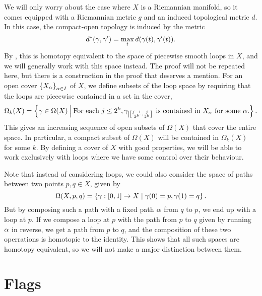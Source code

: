 We will only worry about the case where $X$ is a Riemannian manifold,
so it comes equipped with a Riemannian metric $g$ and an induced
topological metric $d$. In this case, the compact-open topology is
induced by the metric
\[ d^*(\gamma,\gamma') = \max_t d(\gamma(t),\gamma'(t)). \]
By \cite[Theorem 17.1]{milnor}, this is homotopy equivalent to the
space of piecewise smooth loops in $X$, and we will generally work
with this space instead. The proof will not be repeated here, but
there is a construction in the proof that deserves a mention. For an
open cover $\left\{ X_\alpha \right\}_{\alpha\in I}$ of $X$, we define subsets of the
loop space by requiring that the loops are piecewise contained in a
set in the cover,
\[ \Omega_k(X) = \left\{ \gamma \in \Omega(X) \: \Big\vert\:
  \text{For each } j \leq 2^k, \gamma_{\left|\left[
        \frac{j-1}{2^k},\frac{j}{2^k} \right]\right.} \text{ is 
    contained in $X_\alpha$ for some $\alpha$.}  \right\}. \]
This gives an increasing sequence of open subsets of $\Omega(X)$
that cover the entire space. In particular, a compact subset of
$\Omega(X)$ will be contained in $\Omega_k(X)$ for some $k$. By
defining a cover of $X$ with good properties, we will be able to work
exclusively with loops where we have some control
over their behaviour.



Note that instead of considering loops, we could also consider the
space of paths between two points $p,q\in X$, given by
\[ \Omega(X,p,q) = \left\{  \gamma : [0,1] \to X \mid \gamma(0) = p, \gamma(1) = q
 \right\}. \]
But by composing such a path with a fixed path $\alpha$ from $q$ to $p$,
we end up with a loop at $p$. If we compose a loop at $p$ with the
path from $p$ to $q$ given by running $\alpha$ in reverse, we get a path
from $p$ to $q$, and the composition of these two operrations is
homotopic to the identity. This shows that all such spaces 
are homotopy equivalent, so we will not make a major distinction
between them.


\section{Flags}
\label{sec:flags}

